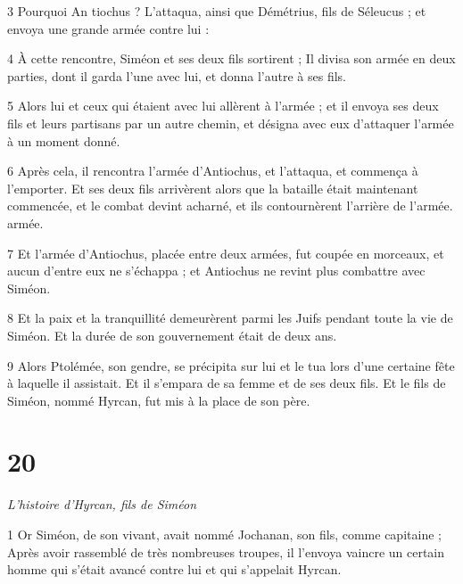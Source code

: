 \par 3 Pourquoi An tiochus ? L'attaqua, ainsi que Démétrius, fils de Séleucus ; et envoya une grande armée contre lui :

\par 4 À cette rencontre, Siméon et ses deux fils sortirent ; Il divisa son armée en deux parties, dont il garda l'une avec lui, et donna l'autre à ses fils.

\par 5 Alors lui et ceux qui étaient avec lui allèrent à l'armée ; et il envoya ses deux fils et leurs partisans par un autre chemin, et désigna avec eux d'attaquer l'armée à un moment donné.

\par 6 Après cela, il rencontra l'armée d'Antiochus, et l'attaqua, et commença à l'emporter. Et ses deux fils arrivèrent alors que la bataille était maintenant commencée, et le combat devint acharné, et ils contournèrent l'arrière de l'armée. armée.

\par 7 Et l'armée d'Antiochus, placée entre deux armées, fut coupée en morceaux, et aucun d'entre eux ne s'échappa ; et Antiochus ne revint plus combattre avec Siméon.

\par 8 Et la paix et la tranquillité demeurèrent parmi les Juifs pendant toute la vie de Siméon. Et la durée de son gouvernement était de deux ans.

\par 9 Alors Ptolémée, son gendre, se précipita sur lui et le tua lors d'une certaine fête à laquelle il assistait. Et il s'empara de sa femme et de ses deux fils. Et le fils de Siméon, nommé Hyrcan, fut mis à la place de son père.

\par [Ici se termine l'histoire telle qu'elle est donnée dans les deux livres habituellement attachés à nos Bibles.]

\chapter{20}

\par \textit{L'histoire d'Hyrcan, fils de Siméon}

\par 1 Or Siméon, de son vivant, avait nommé Jochanan, son fils, comme capitaine ; Après avoir rassemblé de très nombreuses troupes, il l'envoya vaincre un certain homme qui s'était avancé contre lui et qui s'appelait Hyrcan.

